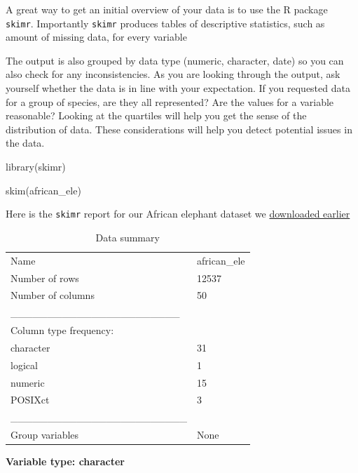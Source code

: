 \documentclass[
  letterpaper,
  DIV=11,
  numbers=noendperiod,
  oneside]{scrreprt}
\newenvironment{Shaded}{\begin{snugshade}}{\end{snugshade}}
\newcommand{\FunctionTok}[1]{\textcolor[rgb]{0.28,0.35,0.67}{#1}}
\newcommand{\NormalTok}[1]{\textcolor[rgb]{0.00,0.23,0.31}{#1}}
\begin{document}
A great way to get an initial overview of your data is to use the R
package \texttt{skimr}. Importantly \texttt{skimr} produces tables of
descriptive statistics, such as amount of missing data, for every
variable

The output is also grouped by data type (numeric, character, date) so
you can also check for any inconsistencies. As you are looking through
the output, ask yourself whether the data is in line with your
expectation. If you requested data for a group of species, are they all
represented? Are the values for a variable reasonable? Looking at the
quartiles will help you get the sense of the distribution of data. These
considerations will help you detect potential issues in the data.

\begin{Shaded}
\begin{Highlighting}[]
\FunctionTok{library}\NormalTok{(skimr)}

\FunctionTok{skim}\NormalTok{(african\_ele)}
\end{Highlighting}
\end{Shaded}

Here is the \texttt{skimr} report for our African elephant dataset we
\protect\hyperlink{sec-download-data}{downloaded earlier}

\begin{longtable}[]{@{}ll@{}}
\caption{Data summary}\tabularnewline
\toprule\noalign{}
\endfirsthead
\endhead
\bottomrule\noalign{}
\endlastfoot
Name & african\_ele \\
Number of rows & 12537 \\
Number of columns & 50 \\
\_\_\_\_\_\_\_\_\_\_\_\_\_\_\_\_\_\_\_\_\_\_\_ & \\
Column type frequency: & \\
character & 31 \\
logical & 1 \\
numeric & 15 \\
POSIXct & 3 \\
\_\_\_\_\_\_\_\_\_\_\_\_\_\_\_\_\_\_\_\_\_\_\_\_ & \\
Group variables & None \\
\end{longtable}

\textbf{Variable type: character}
\end{document}
